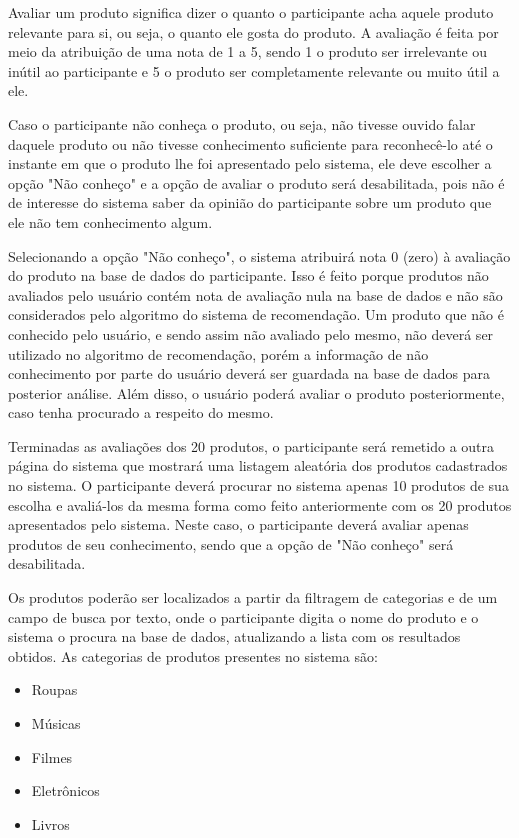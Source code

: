  Avaliar um produto significa dizer o quanto o participante acha aquele produto relevante para si, ou seja, o quanto ele gosta do produto. A avaliação é feita por meio da atribuição de uma nota de 1 a 5, sendo 1 o produto ser irrelevante ou inútil ao participante e 5 o produto ser completamente relevante ou muito útil a ele. 

 Caso o participante não conheça o produto, ou seja, não tivesse ouvido falar daquele produto ou não tivesse conhecimento suficiente para reconhecê-lo até o instante em que o produto lhe foi apresentado pelo sistema, ele deve escolher a opção "Não conheço" e a opção de avaliar o produto será desabilitada, pois não é de interesse do sistema saber da opinião do participante sobre um produto que ele não tem conhecimento algum.

 Selecionando a opção "Não conheço", o sistema atribuirá nota 0 (zero) à avaliação do produto na base de dados do participante. Isso é feito porque produtos não avaliados pelo usuário contém nota de avaliação nula na base de dados e não são considerados pelo algoritmo do sistema de recomendação. Um produto que não é conhecido pelo usuário, e sendo assim não avaliado pelo mesmo, não deverá ser utilizado no algoritmo de recomendação, porém a informação de não conhecimento por parte do usuário deverá ser guardada na base de dados para posterior análise. Além disso, o usuário poderá avaliar o produto posteriormente, caso tenha procurado a respeito do mesmo.

 Terminadas as avaliações dos 20 produtos, o participante será remetido a outra página do sistema que mostrará uma listagem aleatória dos produtos cadastrados no sistema. O participante deverá procurar no sistema apenas 10 produtos de sua escolha e avaliá-los da mesma forma como feito anteriormente com os 20 produtos apresentados pelo sistema. Neste caso, o participante deverá avaliar apenas produtos de seu conhecimento, sendo que a opção de "Não conheço" será desabilitada.

 Os produtos poderão ser localizados a partir da filtragem de categorias e de um campo de busca por texto, onde o participante digita o nome do produto e o sistema o procura na base de dados, atualizando a lista com os resultados obtidos. As categorias de produtos presentes no sistema são:

\begin{itemize}
	\item Roupas
	\item Músicas
	\item Filmes
	\item Eletrônicos
	\item Livros
\end{itemize}

